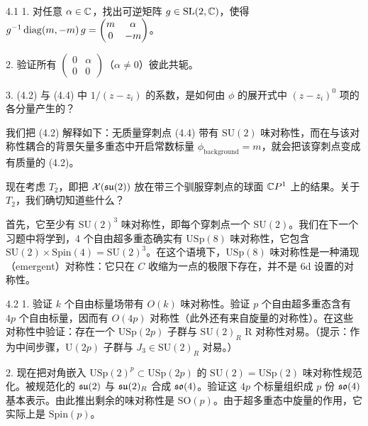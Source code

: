 \begin{exercise}{4.1}
1. 对任意 $\alpha\in\mathbb{C}$，找出可逆矩阵 $g\in\mathrm{SL}(2,\mathbb{C})$，使得 $g^{-1}\operatorname{diag}(m,-m)\,g=\begin{pmatrix} m & \alpha \\ 0 & -m\end{pmatrix}$。

2. 验证所有 $\begin{pmatrix} 0 & \alpha \\ 0 & 0\end{pmatrix}$（$\alpha\neq 0$）彼此共轭。

3. (4.2) 与 (4.4) 中 $1/(z-z_i)$ 的系数，是如何由 $\phi$ 的展开式中 $(z-z_i)^0$ 项的各分量产生的？
\end{exercise}

我们把 (4.2) 解释如下：无质量穿刺点 (4.4) 带有 $\mathrm{SU}(2)$ 味对称性，而在与该对称性耦合的背景矢量多重态中开启常数标量 $\phi_{\text{background}}=m$，就会把该穿刺点变成有质量的 (4.2)。


 现在考虑 $T_2$，即把 $\mathcal{X}(\mathfrak{su}(2))$ 放在带三个驯服穿刺点的球面 $\mathbb{C} P^1$ 上的结果。关于 $T_2$，我们确切知道些什么？

首先，它至少有 $\mathrm{SU}(2)^3$ 味对称性，即每个穿刺点一个 $\mathrm{SU}(2)$。我们在下一个习题中将学到，4 个自由超多重态确实有 $\mathrm{USp}(8)$ 味对称性，它包含 $\mathrm{SU}(2)\times\mathrm{Spin}(4)=\mathrm{SU}(2)^3$。在这个语境下，$\mathrm{USp}(8)$ 味对称性是一种涌现（emergent）对称性：它只在 $C$ 收缩为一点的极限下存在，并不是 6d 设置的对称性。

\begin{exercise}{4.2}
1. 验证 $k$ 个自由标量场带有 $O(k)$ 味对称性。验证 $p$ 个自由超多重态含有 $4p$ 个自由标量，因而有 $O(4p)$ 对称性（此外还有来自旋量的对称性）。在这些对称性中验证：存在一个 $\mathrm{USp}(2p)$ 子群与 $\mathrm{SU}(2)_R$ R 对称性对易。（提示：作为中间步骤，$\mathrm{U}(2p)$ 子群与 $J_3\in\mathrm{SU}(2)_R$ 对易。）

2. 现在把对角嵌入 $\mathrm{USp}(2)^p\subset\mathrm{USp}(2p)$ 的 $\mathrm{SU}(2)=\mathrm{USp}(2)$ 味对称性规范化。被规范化的 $\mathfrak{su}(2)$ 与 $\mathfrak{su}(2)_R$ 合成 $\mathfrak{so}(4)$。验证这 $4p$ 个标量组织成 $p$ 份 $\mathfrak{so}(4)$ 基本表示。由此推出剩余的味对称性是 $\mathrm{SO}(p)$。由于超多重态中旋量的作用，它实际上是 $\mathrm{Spin}(p)$。
\end{exercise}

